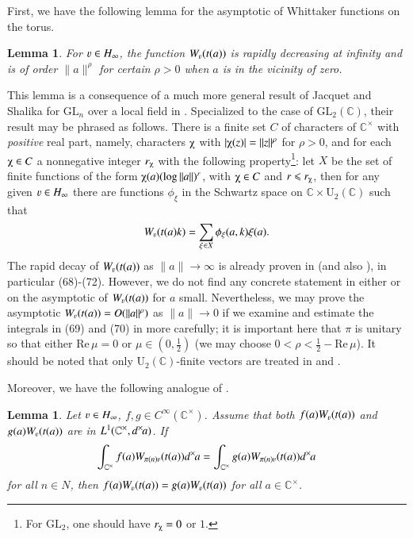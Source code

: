 \documentclass{amsproc}
\newcommand{\BC}{{\mathbb {C}}} \newcommand{\BD}{{\mathbb {D}}}
\newcommand{\GL}{{\mathrm {GL}}} \newcommand{\PGL}{{\mathrm {PGL}}}
\newcommand{\ra}{\rightarrow}
\def\lp {\left (}
\def\rp {\right )}
\def\BCx{\BC^{\times}}
\renewcommand{\Re}{{\mathrm{Re}\,}}
\def\shskip{\hskip 0.5 pt}
\def\dx{d^{\times} \hskip -1 pt}
\theoremstyle{plain}
\newtheorem{lem}[thm]{Lemma}  \newtheorem{prop}[thm]{Proposition}
\numberwithin{equation}{section}
\begin{document}
First, we have the following lemma for the asymptotic of Whittaker functions on the torus. 

\begin{lem}\label{lem: asymptotic of W(t(a))}
	For  $\varv\in H_\infty$, the function  $W_{\varv} (t(a))$ is rapidly decreasing at infinity and is of order $\|a\|^{\rho}$  for certain $\rho > 0$ when $a$ is in the vicinity of zero. 
\end{lem}

This lemma is a consequence of a much more general result of Jacquet and Shalika for $\GL_n $ over a local field in \cite[\S 4.4 Proposition 3]{Jacquet-Shalika:Exterior}. Specialized to the case of $\GL_2 (\BC)$, their result may be phrased as follows. There is a finite set $C$ of characters of $\BCx$ with {\it positive} real part, namely, characters $\chiup $ with $|\chiup (z)| = \|z\|^{\rho}$ for $\rho > 0$, and for each $\chiup \in C$ a nonnegative integer $r_{\chiup}$ with the following property\footnote{For $\GL_2$, one should have $r_{\chiup} = 0$ or $1$.}: let $X$ be the set of finite functions of the form $\chiup (a) ( \log \|a\|)^{r}$, with $\chiup \in C$ and $r \leqslant r_{\chiup}$, then for   any given $\varv \in H_{\infty}$ there are functions $\phi_{\xi}$ in the Schwartz space on $\BC \times \mathrm{U}_2(\BC)$ such that 
\begin{align*}
W_{\varv} (t(a) k) = \sum_{ \xi\shskip \in X } \phi_{\xi} (a, k) \xi (a).
\end{align*} 
The rapid decay of $W_{\varv} (t(a))$ as $\|a\| \ra \infty$ is already proven in   \cite[\S 2.5]{Godement} (and also \cite[\S 6]{J-L}), in particular (68)-(72). However, we do not find any concrete statement in either \cite{J-L} or \cite{Godement} on the asymptotic of $W_{\varv} (t(a) )$ for $a$ small. Nevertheless, we may prove the asymptotic $W_{\varv} (t(a)) = O (\|a\|^{\rho}) $ as $\|a\| \ra 0$ if we examine and estimate the integrals in (69) and (70) in   \cite[\S 2.5]{Godement} more carefully; it is important here that $\pi$ is unitary so that either $\Re \mu = 0$ or $\mu \in \lp 0, \frac 1 2 \rp$ (we may choose $0 < \rho < \frac 1 2 - \Re \mu$). It should be noted that only $\mathrm{U}_2 (\BC)$-finite vectors are treated in \cite[\S 6]{J-L} and \cite[\S 2.5]{Godement}.



Moreover, we have the following analogue of    \cite[Lemma 2.1]{BaruchMao-Real}.
\begin{lem}\label{le21}
Let $\varv\in H_\infty$, $f,g\in C^\infty(\BCx)$. Assume that both $f(a)W_\varv(t(a))$ and $g(a)W_\varv(t(a))$ are in $L^1(\BCx, \dx  a)$. If
\[
\int_{\BCx} f(a)W_{\pi(n)\varv}(t(a))\dx  a=\int_{\BCx} g(a)W_{\pi(n)\varv}(t(a))\dx  a
\]
for all $n\in N$, then $f(a)W_\varv(t(a))=g(a)W_\varv(t(a))$ for all $a\in \BCx$.
\end{lem}
\end{document}
